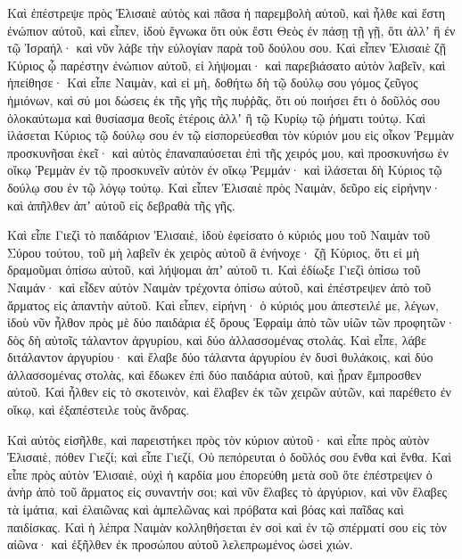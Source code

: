 {\par }{\PP {}Καὶ ἐπέστρεψε πρὸς Ἐλισαιὲ αὐτὸς καὶ πᾶσα ἡ παρεμβολὴ αὐτοῦ, καὶ ἦλθε καὶ ἔστη ἐνώπιον αὐτοῦ, καὶ εἶπεν, ἰδοὺ ἔγνωκα ὅτι οὐκ ἔστι Θεὸς ἐν πάσῃ τῇ γῇ, ὅτι ἀλλʼ ἢ ἐν τῷ Ἰσραήλ· καὶ νῦν λάβε τὴν εὐλογίαν παρὰ τοῦ δούλου σου.
Καὶ εἶπεν Ἐλισαιὲ ζῇ Κύριος ᾧ παρέστην ἐνώπιον αὐτοῦ, εἰ λήψομαι· καὶ παρεβιάσατο αὐτὸν λαβεῖν, καὶ ἠπείθησε·
Καὶ εἶπε Ναιμὰν, καὶ εἰ μὴ, δοθήτω δὴ τῷ δούλῳ σου γόμος ζεῦγος ἡμιόνων, καὶ σύ μοι δώσεις ἐκ τῆς γῆς τῆς πυῤῥᾶς, ὅτι οὐ ποιήσει ἔτι ὁ δοῦλός σου ὁλοκαύτωμα καὶ θυσίασμα θεοῖς ἑτέροις ἀλλʼ ἢ τῷ Κυρίῳ τῷ ῥήματι τούτῳ.
Καὶ ἱλάσεται Κύριος τῷ δούλῳ σου ἐν τῷ εἰσπορεύεσθαι τὸν κύριόν μου εἰς οἶκον Ῥεμμὰν προσκυνῆσαι ἐκεῖ· καὶ αὐτὸς ἐπαναπαύσεται ἐπὶ τῆς χειρός μου, καὶ προσκυνήσω ἐν οἴκῳ Ῥεμμὰν ἐν τῷ προσκυνεῖν αὐτὸν ἐν οἴκῳ Ῥεμμάν· καὶ ἱλάσεται δὴ Κύριος τῷ δούλῳ σου ἐν τῷ λόγῳ τούτῳ.
Καὶ εἶπεν Ἐλισαιὲ πρὸς Ναιμὰν, δεῦρο εἰς εἰρήνην· καὶ ἀπῆλθεν ἀπʼ αὐτοῦ εἰς δεβραθὰ τῆς γῆς.
\par }{\PP {}Καὶ εἶπε Γιεζὶ τὸ παιδάριον Ἐλισαιὲ, ἰδοὺ ἐφείσατο ὁ κύριός μου τοῦ Ναιμὰν τοῦ Σύρου τούτου, τοῦ μὴ λαβεῖν ἐκ χειρὸς αὐτοῦ ἃ ἐνήνοχε· ζῇ Κύριος, ὅτι εἰ μὴ δραμοῦμαι ὀπίσω αὐτοῦ, καὶ λήψομαι ἀπʼ αὐτοῦ τι.
Καὶ ἐδίωξε Γιεζὶ ὀπίσω τοῦ Ναιμάν· καὶ εἶδεν αὐτὸν Ναιμὰν τρέχοντα ὀπίσω αὐτοῦ, καὶ ἐπέστρεψεν ἀπὸ τοῦ ἅρματος εἰς ἀπαντὴν αὐτοῦ.
Καὶ εἶπεν, εἰρήνη· ὁ κύριός μου ἀπεστειλέ με, λέγων, ἰδοὺ νῦν ἦλθον πρὸς μὲ δύο παιδάρια ἐξ ὄρους Ἐφραὶμ ἀπὸ τῶν υἱῶν τῶν προφητῶν· δὸς δὴ αὐτοῖς τάλαντον ἀργυρίου, καὶ δύο ἀλλασσομένας στολάς.
Καὶ εἶπε, λάβε διτάλαντον ἀργυρίου· καὶ ἔλαβε δύο τάλαντα ἀργυρίου ἐν δυσὶ θυλάκοις, καὶ δύο ἀλλασσομένας στολὰς, καὶ ἔδωκεν ἐπὶ δύο παιδάρια αὐτοῦ, καὶ ᾖραν ἔμπροσθεν αὐτοῦ.
Καὶ ἦλθεν εἰς τὸ σκοτεινὸν, καὶ ἔλαβεν ἐκ τῶν χειρῶν αὐτῶν, καὶ παρέθετο ἐν οἴκῳ, καὶ ἐξαπέστειλε τοὺς ἄνδρας.
\par }{\PP {}Καὶ αὐτὸς εἰσῆλθε, καὶ παρειστήκει πρὸς τὸν κύριον αὐτοῦ· καὶ εἶπε πρὸς αὐτὸν Ἐλισαιὲ, πόθεν Γιεζί; καὶ εἶπε Γιεζί, Οὐ πεπόρευται ὁ δοῦλός σου ἔνθα καὶ ἔνθα.
Καὶ εἶπε πρὸς αὐτὸν Ἐλισαιὲ, οὐχὶ ἡ καρδία μου ἐπορεύθη μετὰ σοῦ ὅτε ἐπέστρεψεν ὁ ἀνὴρ ἀπὸ τοῦ ἅρματος εἰς συναντήν σοι; καὶ νῦν ἔλαβες τὸ ἀργύριον, καὶ νῦν ἔλαβες τὰ ἱμάτια, καὶ ἐλαιῶνας καὶ ἀμπελῶνας καὶ πρόβατα καὶ βόας καὶ παῖδας καὶ παιδίσκας.
Καὶ ἡ λέπρα Ναιμὰν κολληθήσεται ἐν σοὶ καὶ ἐν τῷ σπέρματί σου εἰς τὸν αἰῶνα· καὶ ἐξῆλθεν ἐκ προσώπου αὐτοῦ λελεπρωμένος ὡσεὶ χιών.

}
